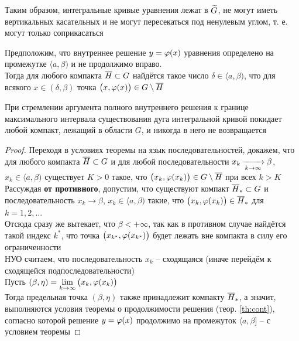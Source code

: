 Таким образом, интегральные кривые уравнения  лежат в $ \widetilde{G} $, не могут иметь вертикальных касательных и не могут пересекаться под ненулевым углом, т. е. могут только соприкасаться

\begin{theorem}
    Предположим, что внутреннее решение $ y = \varphi(x) $ уравнения  определено на промежутке $ \langle a, \beta) $ и не продолжимо вправо. \\
    Тогда для любого компакта $ \overline{H} \subset G $ найдётся такое число $ \delta \in \langle a, \beta) $, что для всякого $ x \in (\delta, \beta) $ точка $ \big( x, \varphi(x) \big) \in G \setminus \overline{H} $
\end{theorem}

\begin{restate}
	При стремлении аргумента полного внутреннего решения к границе максимального интервала существования дуга интегральной кривой покидает любой компакт, лежащий в области $ G $, и никогда в него не возвращается
\end{restate}

\begin{proof}
    Переходя в условиях теоремы на язык последовательностей, докажем, что для любого компакта $ \overline{H} \subset G $ и для любой последовательности $ x_k \xrightarrow[k \to \infty]{} \beta $, $ x_k \in \langle a, \beta) $ существует $ K > 0 $ такое, что $ \big( x_k, \varphi(x_k) \big) \in G \setminus \overline{H} $ при всех $ k > K $ \\
    Рассуждая \textbf{от противного}, допустим, что существуют компакт $ \overline{H}_* \subset G $ и последовательность $ x_k \to \beta $, $ x_k \in \langle a, \beta) $ такие, что $ \big( x_k, \varphi(x_k) \big) \in \overline{H}_* $ для $ k = 1, 2, ... $ \\
    Отсюда сразу же вытекает, что $ \beta < +\infty $, так как в противном случае найдётся такой индекс $ k^* $, что точка $ \big( x_{k^*}, \varphi(x_{k^*}) \big) $ будет лежать вне компакта в силу его ограниченности \\
    НУО считаем, что последовательность $ x_k $ -- сходящаяся (иначе перейдём к сходящейся подпоследовательности) \\
    Пусть $ (\beta, \eta) = \lim\limits_{k\to\infty} \big( x_k, \varphi(x_k) \big) $ \\
    Тогда предельная точка $ (\beta, \eta) $ также принадлежит компакту $ \overline{H}_* $, а значит, выполняются условия теоремы о продолжимости решения (теор. \ref{th:cont}), согласно которой решение $ y = \varphi(x) $ продолжимо на промежуток $ \langle a, \beta] $ -- \contra с условием теоремы
\end{proof}

